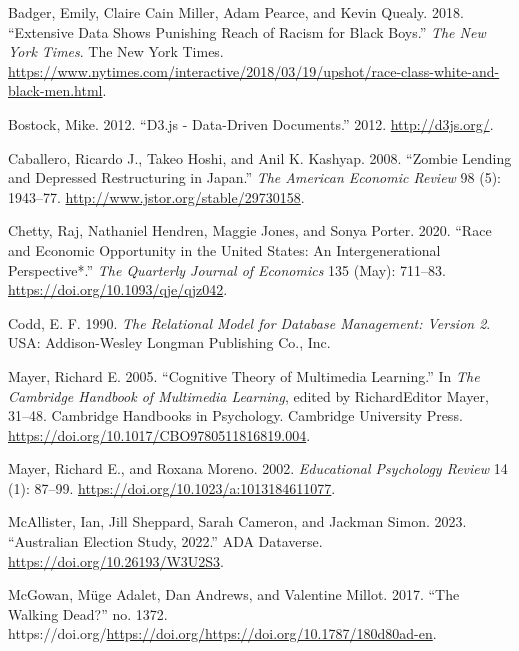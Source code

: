 \hypertarget{refs}{}
\begin{CSLReferences}{1}{0}
\leavevmode{}%
Badger, Emily, Claire Cain Miller, Adam Pearce, and Kevin Quealy. 2018. {``Extensive Data Shows Punishing Reach of Racism for Black Boys.''} \emph{The New York Times}. The New York Times. \url{https://www.nytimes.com/interactive/2018/03/19/upshot/race-class-white-and-black-men.html}.

\leavevmode{}%
Bostock, Mike. 2012. {``D3.js - Data-Driven Documents.''} 2012. \url{http://d3js.org/}.

\leavevmode{}%
Caballero, Ricardo J., Takeo Hoshi, and Anil K. Kashyap. 2008. {``Zombie Lending and Depressed Restructuring in Japan.''} \emph{The American Economic Review} 98 (5): 1943--77. \url{http://www.jstor.org/stable/29730158}.

\leavevmode{}%
Chetty, Raj, Nathaniel Hendren, Maggie Jones, and Sonya Porter. 2020. {``Race and Economic Opportunity in the United States: An Intergenerational Perspective*.''} \emph{The Quarterly Journal of Economics} 135 (May): 711--83. \url{https://doi.org/10.1093/qje/qjz042}.

\leavevmode{}%
Codd, E. F. 1990. \emph{The Relational Model for Database Management: Version 2}. USA: Addison-Wesley Longman Publishing Co., Inc.

\leavevmode{}%
Mayer, Richard E. 2005. {``Cognitive Theory of Multimedia Learning.''} In \emph{The Cambridge Handbook of Multimedia Learning}, edited by RichardEditor Mayer, 31--48. Cambridge Handbooks in Psychology. Cambridge University Press. \url{https://doi.org/10.1017/CBO9780511816819.004}.

\leavevmode{}%
Mayer, Richard E., and Roxana Moreno. 2002. \emph{Educational Psychology Review} 14 (1): 87--99. \url{https://doi.org/10.1023/a:1013184611077}.

\leavevmode{}%
McAllister, Ian, Jill Sheppard, Sarah Cameron, and Jackman Simon. 2023. {``Australian Election Study, 2022.''} ADA Dataverse. \url{https://doi.org/10.26193/W3U2S3}.

\leavevmode{}%
McGowan, Müge Adalet, Dan Andrews, and Valentine Millot. 2017. {``The Walking Dead?''} no. 1372. https://doi.org/\url{https://doi.org/https://doi.org/10.1787/180d80ad-en}.


\end{CSLReferences}
